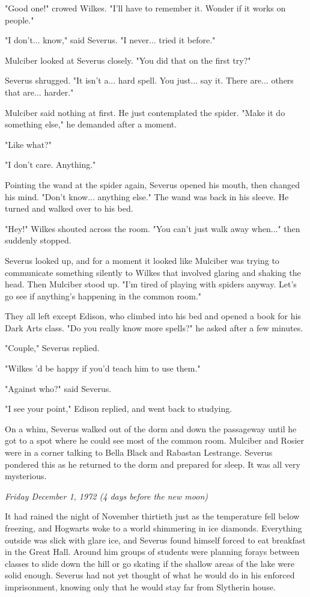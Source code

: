 \documentclass[a4paper,11pt]{article}
\begin{document}
"Good one!" crowed Wilkes. "I'll have to remember it. Wonder if it works on people."

"I don't... know," said Severus. "I never... tried it before."

Mulciber looked at Severus closely. "You did that on the first try?"

Severus shrugged. "It isn't a... hard spell. You just... say it. There are... others that are... harder."

Mulciber said nothing at first. He just contemplated the spider. "Make it do something else," he demanded after a moment.

"Like what?"

"I don't care. Anything."

Pointing the wand at the spider again, Severus opened his mouth, then changed his mind. "Don't know... anything else." The wand was back in his sleeve. He turned and walked over to his bed.

"Hey!" Wilkes shouted across the room. "You can't just walk away when..." then suddenly stopped.

Severus looked up, and for a moment it looked like Mulciber was trying to communicate something silently to Wilkes that involved glaring and shaking the head. Then Mulciber stood up. "I'm tired of playing with spiders anyway. Let's go see if anything's happening in the common room."

They all left except Edison, who climbed into his bed and opened a book for his Dark Arts class. "Do you really know more spells?" he asked after a few minutes.

"Couple," Severus replied.

"Wilkes 'd be happy if you'd teach him to use them."

"Against who?" said Severus.

"I see your point," Edison replied, and went back to studying.

On a whim, Severus walked out of the dorm and down the passageway until he got to a spot where he could see most of the common room. Mulciber and Rosier were in a corner talking to Bella Black and Rabastan Lestrange. Severus pondered this as he returned to the dorm and prepared for sleep. It was all very mysterious.

\emph{Friday December 1, 1972 (4 days before the new moon)}

It had rained the night of November thirtieth just as the temperature fell below freezing, and Hogwarts woke to a world shimmering in ice diamonds. Everything outside was slick with glare ice, and Severus found himself forced to eat breakfast in the Great Hall. Around him groups of students were planning forays between classes to slide down the hill or go skating if the shallow areas of the lake were solid enough. Severus had not yet thought of what he would do in his enforced imprisonment, knowing only that he would stay far from Slytherin house.
\end{document}
